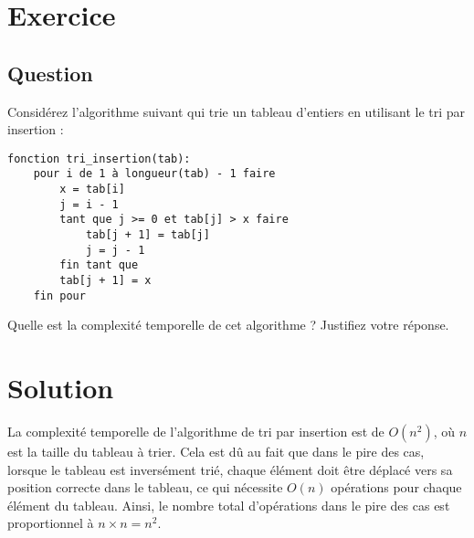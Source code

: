 \documentclass{article}
\begin{document}
\section{Exercice}

\subsection*{Question}
Considérez l'algorithme suivant qui trie un tableau d'entiers en utilisant le tri par insertion :
\begin{verbatim}
fonction tri_insertion(tab):
    pour i de 1 à longueur(tab) - 1 faire
        x = tab[i]
        j = i - 1
        tant que j >= 0 et tab[j] > x faire
            tab[j + 1] = tab[j]
            j = j - 1
        fin tant que
        tab[j + 1] = x
    fin pour
\end{verbatim}

Quelle est la complexité temporelle de cet algorithme ? Justifiez votre réponse.

\section{Solution}
La complexité temporelle de l'algorithme de tri par insertion est de \(O(n^2)\), où \(n\) est la taille du tableau à trier. Cela est dû au fait que dans le pire des cas, lorsque le tableau est inversément trié, chaque élément doit être déplacé vers sa position correcte dans le tableau, ce qui nécessite \(O(n)\) opérations pour chaque élément du tableau. Ainsi, le nombre total d'opérations dans le pire des cas est proportionnel à \(n \times n = n^2\).
\end{document}

